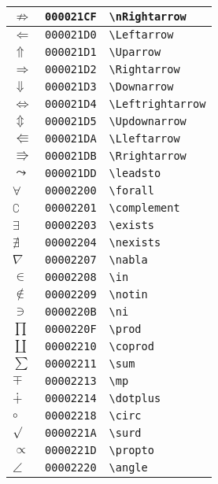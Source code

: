 \begin{longtable}{|l|l|l|}
\hline
$\nRightarrow$ & \texttt{000021CF} & \verb|\nRightarrow| \\
\hline
$\Leftarrow$ & \texttt{000021D0} & \verb|\Leftarrow| \\
\hline
$\Uparrow$ & \texttt{000021D1} & \verb|\Uparrow| \\
\hline
$\Rightarrow$ & \texttt{000021D2} & \verb|\Rightarrow| \\
\hline
$\Downarrow$ & \texttt{000021D3} & \verb|\Downarrow| \\
\hline
$\Leftrightarrow$ & \texttt{000021D4} & \verb|\Leftrightarrow| \\
\hline
$\Updownarrow$ & \texttt{000021D5} & \verb|\Updownarrow| \\
\hline
$\Lleftarrow$ & \texttt{000021DA} & \verb|\Lleftarrow| \\
\hline
$\Rrightarrow$ & \texttt{000021DB} & \verb|\Rrightarrow| \\
\hline
$\leadsto$ & \texttt{000021DD} & \verb|\leadsto| \\
\hline
$\forall$ & \texttt{00002200} & \verb|\forall| \\
\hline
$\complement$ & \texttt{00002201} & \verb|\complement| \\
\hline
$\exists$ & \texttt{00002203} & \verb|\exists| \\
\hline
$\nexists$ & \texttt{00002204} & \verb|\nexists| \\
\hline
$\nabla$ & \texttt{00002207} & \verb|\nabla| \\
\hline
$\in$ & \texttt{00002208} & \verb|\in| \\
\hline
$\notin$ & \texttt{00002209} & \verb|\notin| \\
\hline
$\ni$ & \texttt{0000220B} & \verb|\ni| \\
\hline
$\prod$ & \texttt{0000220F} & \verb|\prod| \\
\hline
$\coprod$ & \texttt{00002210} & \verb|\coprod| \\
\hline
$\sum$ & \texttt{00002211} & \verb|\sum| \\
\hline
$\mp$ & \texttt{00002213} & \verb|\mp| \\
\hline
$\dotplus$ & \texttt{00002214} & \verb|\dotplus| \\
\hline
$\circ$ & \texttt{00002218} & \verb|\circ| \\
\hline
$\surd$ & \texttt{0000221A} & \verb|\surd| \\
\hline
$\propto$ & \texttt{0000221D} & \verb|\propto| \\
\hline
$\angle$ & \texttt{00002220} & \verb|\angle| \\

\end{longtable}
